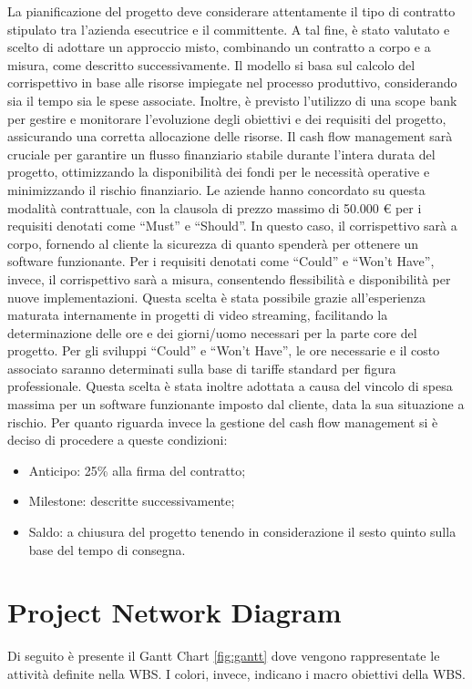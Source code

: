 \documentclass[a4paper,12pt, openright]{report}
\begin{document}
La pianificazione del progetto deve considerare attentamente il tipo di contratto stipulato tra l'azienda esecutrice e il committente. A tal fine, è stato valutato e scelto di adottare un approccio misto, combinando un contratto a corpo e a misura, come descritto successivamente. Il modello si basa sul calcolo del corrispettivo in base alle risorse impiegate nel processo produttivo, considerando sia il tempo sia le spese associate. Inoltre, è previsto l'utilizzo di una scope bank per gestire e monitorare l'evoluzione degli obiettivi e dei requisiti del progetto, assicurando una corretta allocazione delle risorse. Il cash flow management sarà cruciale per garantire un flusso finanziario stabile durante l'intera durata del progetto, ottimizzando la disponibilità dei fondi per le necessità operative e minimizzando il rischio finanziario. 
Le aziende hanno concordato su questa modalità contrattuale, con la clausola di prezzo massimo di 50.000 € per i requisiti denotati come ``Must'' e ``Should''. In questo caso, il corrispettivo sarà a corpo, fornendo al cliente la sicurezza di quanto spenderà per ottenere un software funzionante. Per i requisiti denotati come ``Could'' e ``Won't Have'', invece, il corrispettivo sarà a misura, consentendo flessibilità e disponibilità per nuove implementazioni. Questa scelta è stata possibile grazie all'esperienza maturata internamente in progetti di video streaming, facilitando la determinazione delle ore e dei giorni/uomo necessari per la parte core del progetto. Per gli sviluppi ``Could'' e ``Won't Have'', le ore necessarie e il costo associato saranno determinati sulla base di tariffe standard per figura professionale. Questa scelta è stata inoltre adottata a causa del vincolo di spesa massima per un software funzionante imposto dal cliente, data la sua situazione a rischio.
Per quanto riguarda invece la gestione del cash flow management si è deciso di procedere a queste condizioni: 
\begin{itemize}
    \item Anticipo: 25\% alla firma del contratto;
    \item Milestone: descritte successivamente; 
    \item Saldo: a chiusura del progetto tenendo in considerazione il sesto quinto sulla base del tempo di consegna.
\end{itemize}

\section{Project Network Diagram}
Di seguito è presente il Gantt Chart \ref{fig:gantt} dove vengono rappresentate le attività definite nella WBS. I colori, invece, indicano i macro obiettivi della WBS.
\end{document}
